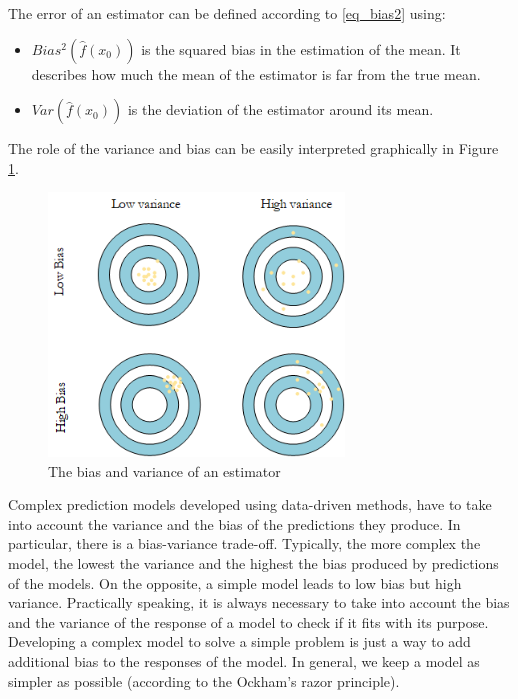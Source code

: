 The error of an estimator can be defined according to \ref{eq_bias2} using:
\begin{itemize}
    \item 	$Bias^2\left(\hat{f}\left(x_0\right)\right)$ is the squared bias in the estimation of the mean. It describes how much the mean of the estimator is far from the true mean.
    \item 	$Var\left(\hat{f}\left(x_0\right)\right)$ is the deviation of the estimator around its mean.
\end{itemize}

The role of the variance and bias can be easily interpreted graphically in Figure \ref{fig_biasVariance}.

\begin{figure}[hbt!]
\centering
\includegraphics[width=0.7\textwidth]{SectionLetsMath/elemStat_figures/fig_biasVariance.png}
\captionsetup{type=figure}
\caption{The bias and variance of an estimator}
\label{fig_biasVariance}
\end{figure}

Complex prediction models developed using data-driven methods, have to take into account the variance and the bias of the predictions they produce. In particular, there is a bias-variance trade-off. Typically, the more complex the model, the lowest the variance and the highest the bias produced by predictions of the models. On the opposite, a simple model leads to low bias but high variance. Practically speaking, it is always necessary to take into account the bias and the variance of the response of a model to check if it fits with its purpose. Developing a complex model to solve a simple problem is just a way to add additional bias to the responses of the model. In general, we keep a model as simpler as possible (according to the Ockham's razor principle). \par

